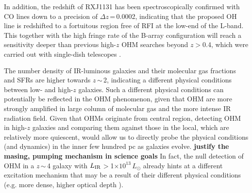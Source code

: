 \documentclass[letterpaper,11pt]{article}
\newcommand{\Lsun}{\mbox{$L_{\odot}$}\xspace}
\newcommand{\LIR}{\mbox{$L_{\rm IR}$}\xspace}
\newcommand{\Fig}[1]{Fig.~\ref{fig:#1}}
\newcommand{\E}[1]{\mbox{$\times10^{#1}$}}
\newcommand{\eq}{\,=\,}
\newcommand{\ssim}{\,$\sim$\,}
\begin{document}
In addition, the redshift of RXJ1131 has been spectroscopically confirmed with CO lines down to a precision of 
$\Delta z$\eq0.0002, indicating that the proposed OH line is redshifted to a fortuitous region 
free of RFI at the low-end of the L-band. 
This together with the high fringe rate of the B-array configuration will 
reach a sensitivity deeper than previous high-$z$ OHM searches beyond $z$$>$0.4, which were carried out 
with single-dish telescopes \citep[\Fig{model}b; e.g.][]{Darling02a, Willett12a}.


The number density of IR-luminous galaxies and their molecular gas fractions and SFRs
are higher towards $z$\ssim2,
indicating a different physical conditions between low- and high-$z$ galaxies.
Such a different physical conditions can potentially be reflected in the OHM phenomenon, given that OHM are more strongly amplified in 
large column of molecular gas and the more intense IR radiation field.
Given that OHMs originate from central region, detecting OHM in high-$z$ galaxies and comparing them against those in the local, which are 
relatively more quiescent, would allow us to directly probe the physical conditions (and dynamics) in the inner few hundred pc
as galaxies evolve. {\bf justify the masing, pumping mechanism in science goals}
In fact, the null detection of OHM in a $z$\ssim4 galaxy with \LIR$>$1\E{13}\,\Lsun already hints at a different 
excitation mechanism that may be a result of their different physical conditions (e.g. more dense, higher optical depth \citet{Ivision06a}).
\end{document}
